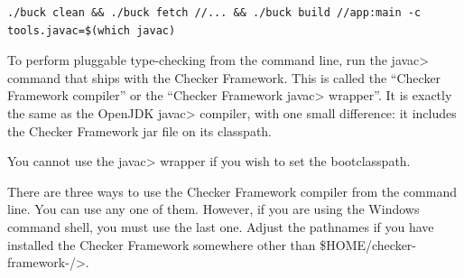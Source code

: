 \begin{Verbatim}
./buck clean && ./buck fetch //... && ./buck build //app:main -c tools.javac=$(which javac)
\end{Verbatim}


\label{javac-installation}      %

To perform pluggable type-checking from the command line, run the \<javac>
command that ships with the Checker Framework.  This is called the
``Checker Framework compiler'' or the ``Checker Framework \<javac> wrapper''.
It is exactly the same as the OpenJDK
\<javac> compiler, with one small difference:  it includes the Checker
Framework jar file on its classpath.

You cannot use the \<javac> wrapper if you wish to set the bootclasspath.

There are three ways to use the Checker Framework compiler from the command
line.  You can use any
one of them.  However, if you are using the Windows command shell, you must
use the last one.
Adjust the pathnames if you have installed the Checker Framework somewhere
other than \<\${HOME}/checker-framework-\ReleaseVersion{}/>.


